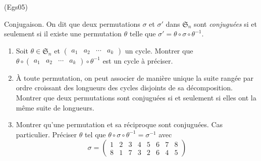 \begin{tiny}(Egs05)\end{tiny} \label{Egs05} Conjugaison.\newline
On dit que deux permutations $\sigma$ et $\sigma'$ dans $\mathfrak{S}_n$ sont \emph{conjuguées} si et seulement si il existe une permutation $\theta$ telle que $\sigma' = \theta\circ \sigma \circ \theta^{-1}$.
\begin{enumerate}
 \item Soit $\theta \in \mathfrak{S}_n$ et $\begin{pmatrix} a_{1} & a_{2} & \cdots  & a_{k}\end{pmatrix}$ un cycle. Montrer que $\theta \circ 
\begin{pmatrix}
 a_{1} & a_{2} & \cdots & a_{k}
\end{pmatrix}
\circ \theta ^{-1}
$ 
est un cycle {\`a} pr{\'e}ciser.
\item \`A toute permutation, on peut associer de manière unique la suite rangée par ordre croissant des longueurs des cycles disjoints de sa décomposition. Montrer que deux permutations sont conjuguées si et seulement si elles ont la même suite de longueurs.
\item Montrer qu'une permutation et sa réciproque sont conjuguées.\newline
Cas particulier. Préciser $\theta$ tel que $\theta\circ \sigma \circ \theta^{-1} = \sigma^{-1}$ avec
\begin{displaymath}
 \sigma =
\begin{pmatrix}
 1 & 2 & 3 & 4 & 5 & 6 & 7 & 8 \\8 & 1 & 7 & 3 & 2 & 6 & 4 & 5 
\end{pmatrix}
\end{displaymath}  
\end{enumerate}
